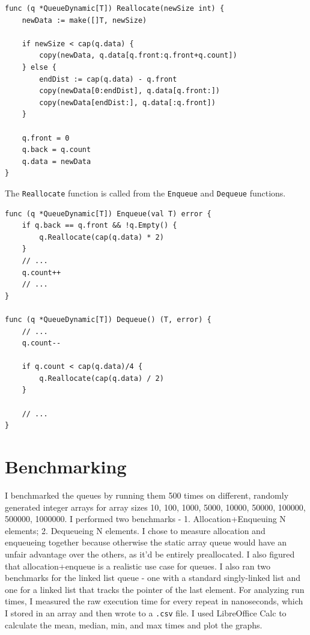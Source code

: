 \documentclass[a4paper,11pt]{article}
\begin{document}
    \begin{verbatim}
func (q *QueueDynamic[T]) Reallocate(newSize int) {
    newData := make([]T, newSize)

    if newSize < cap(q.data) {
        copy(newData, q.data[q.front:q.front+q.count])
    } else {
        endDist := cap(q.data) - q.front
        copy(newData[0:endDist], q.data[q.front:])
        copy(newData[endDist:], q.data[:q.front])
    }

    q.front = 0
    q.back = q.count
    q.data = newData
}
    \end{verbatim}

    The \texttt{Reallocate} function is called from the \texttt{Enqueue} and \texttt{Dequeue} functions.

    \begin{verbatim}
func (q *QueueDynamic[T]) Enqueue(val T) error {
    if q.back == q.front && !q.Empty() {
        q.Reallocate(cap(q.data) * 2)
    }
    // ...
    q.count++
    // ...
}

func (q *QueueDynamic[T]) Dequeue() (T, error) {
    // ...
    q.count--

    if q.count < cap(q.data)/4 {
        q.Reallocate(cap(q.data) / 2)
    }

    // ...
}
    \end{verbatim}

    \section*{Benchmarking}

    I benchmarked the queues by running them 500 times on different, randomly generated integer arrays for array sizes 10, 100, 1000, 5000, 10000, 50000, 100000, 500000, 1000000. I performed two benchmarks - 1. Allocation+Enqueuing N elements; 2. Dequeueing N elements. I chose to measure allocation and enqueueing together because otherwise the static array queue would have an unfair advantage over the others, as it'd be entirely preallocated. I also figured that allocation+enqueue is a realistic use case for queues. I also ran two benchmarks for the linked list queue - one with a standard singly-linked list and one for a linked list that tracks the pointer of the last element. For analyzing run times, I measured the raw execution time for every repeat in nanoseconds, which I stored in an array and then wrote to a \texttt{.csv} file. I used LibreOffice Calc to calculate the mean, median, min, and max times and plot the graphs.
\end{document}
